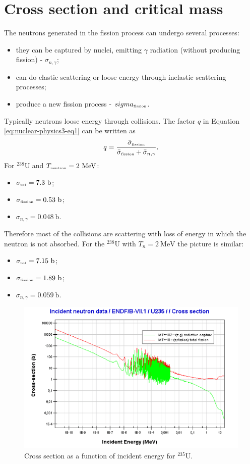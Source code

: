 \section{Cross section and critical mass}
The neutrons generated in the fission process can undergo several processes:
\begin{itemize}
    \item they can be captured by nuclei, emitting $\gamma$ radiation (without producing fission) - $\sigma_{n,\gamma}$;
    \item can do elastic scattering or loose energy through inelastic scattering processes;
    \item produce a new fission process - $sigma_{\tiny\mbox{fission}}$.
\end{itemize}
Typically neutrons loose energy through collisions. The factor $q$ in Equation \ref{eq:nuclear-physics3-eq1} can be written as 
\begin{equation}
    q = \frac{\bar{\sigma}_{\tiny\mbox{fission}}}{\bar{\sigma}_{\tiny\mbox{fission}} + \bar{\sigma}_{n,\gamma}}.
\end{equation}
For $^{238}\mbox{U}$ and $T_{\tiny\mbox{neutron}} = 2~\mbox{MeV}$:
\begin{itemize}
    \item $\sigma_{\tiny{\mbox{tot}}} = 7.3~\mbox{b}$;
    \item $\sigma_{\tiny{\mbox{fission}}} = 0.53~\mbox{b}$;
    \item $\sigma_{n,\gamma} = 0.048~\mbox{b}$.
\end{itemize}
Therefore most of the collisions are scattering with loss of energy in which the neutron is not absorbed.
For the $^{238}\mbox{U}$ with $T_{n} = 2~\mbox{MeV}$ the picture is similar:
\begin{itemize}
    \item $\sigma_{\tiny{\mbox{tot}}} = 7.15~\mbox{b}$;
    \item $\sigma_{\tiny{\mbox{fission}}} = 1.89~\mbox{b}$;
    \item $\sigma_{n,\gamma} = 0.059~\mbox{b}$.
\end{itemize}
\begin{figure}
    \centering
    \includegraphics{Figures/nuclear-physics3-fig7.pdf}
    \caption{Cross section as a function of incident energy for $^{235}\mbox{U}$.}
    \label{fig:nuclear-physics-fig7}
\end{figure}
